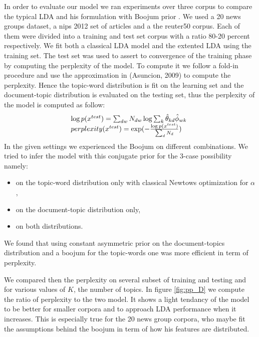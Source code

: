 In order to evaluate our model we ran experiments over three corpus to compare the typical LDA and his formulation with Boojum prior . We used a 20 news groups dataset, a nips 2012 set of articles and a the reuter50 corpus. Each of them were divided into a training and test set corpus with a ratio 80-20 percent respectively. We fit both a classical LDA model and the extented LDA using the training set. The test set was used to assert to convergence of the training phase by computing the perplexity of the model. To compute it we follow a fold-in procedure and  use the approximation in (Asuncion, 2009) to compute the perplexity. Hence the topic-word distribution is fit on the learning set and the document-topic distribution is evaluated on the testing set, thus the perplexity of the model is computed as follow: 
\[
\begin{array}{l@{\hspace{.3cm}}l}
\log p(x^{test}) = \sum_{dw} N_{dw} \log \sum_k \hat{\theta}_{kd} \hat{\phi}_{wk} \\
perplexity(x^{test}) = \exp(- \frac{\log p(x^{test})}{\sum_d N_d})
\end{array}
\]
In the given settings we experienced the Boojum on different combinations. We tried to infer the model with this conjugate prior for the 3-case possibility namely:
\begin{itemize}
\item on the topic-word distribution only with classical Newtows optimization for $\alpha$,
\item on the document-topic distribution only,
\item on both distributions. 
\end{itemize}
We found that using constant asymmetric prior on the document-topics distribution and a boojum for the topic-words one was more efficient in term of perplexity.

We compared then the perplexity on several subset of training and testing and for various values of $K$, the number of topics. In figure \ref{fig:pp_D} we compute the ratio of perplexity to the two model. It shows a light tendancy of the model to be better for smaller corpora and to approach LDA performance when it increases. This is especially true for the 20 news group corpora, who maybe fit the assumptions behind the boojum in term of how his features are distributed. 

